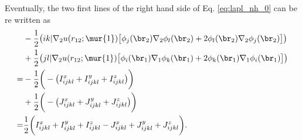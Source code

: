 Eventually, the two first lines of the right hand side of Eq. \eqref{eq:lapl_nh_0} can be re written as  
\begin{equation}
 \label{eq:lapl_nh_end}
 \begin{aligned}
 & -\frac{1}{2} \big(ik|\nabla_2u(r_{12};\mur{1}) \big[ \phi_j(\br_2)\nabla_2 \phi_l(\br_2) + 2 \phi_l(\br_2) \nabla_2 \phi_j(\br_2)\big] \big) \\
 & +\frac{1}{2} \big(jl|\nabla_2u(r_{12};\mur{1}) \big[ \phi_i(\br_1)\nabla_1 \phi_k(\br_1) + 2 \phi_k(\br_1) \nabla_1 \phi_i(\br_1)\big] \big) \\
 =&  - \frac{1}{2} \bigg( -\big( I_{ijkl}^x + I_{ijkl}^y + I_{ijkl}^z\big) \bigg) \\
 &  +  \frac{1}{2} \bigg( -\big( J_{ijkl}^x + J_{ijkl}^y + J_{ijkl}^z \big) \bigg) \\
 =& \frac{1}{2} \bigg( I_{ijkl}^x + I_{ijkl}^y + I_{ijkl}^z - J_{ijkl}^x + J_{ijkl}^y + J_{ijkl}^z \bigg). 
 \end{aligned}
\end{equation}

